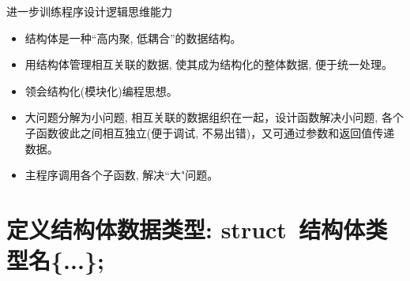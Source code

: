 
\begin{frame}{进一步训练程序设计逻辑思维能力}
\begin{itemize}
	\setlength{\itemsep}{.5cm}
	\item 结构体是一种``高内聚, 低耦合''的数据结构。 
	\item 用结构体管理相互关联的数据, 使其成为结构化的整体数据, 便于统一处理。 
	\item 领会结构化(模块化)编程思想。
	\item 大问题分解为小问题, 相互关联的数据组织在一起，设计函数解决小问题, 各个子函数彼此之间相互独立(便于调试, 不易出错)，又可通过参数和返回值传递数据。
	\item 主程序调用各个子函数, 解决``大"问题。
\end{itemize}
\end{frame}



\section{定义结构体数据类型:  struct\, 结构体类型名\{...\};}

